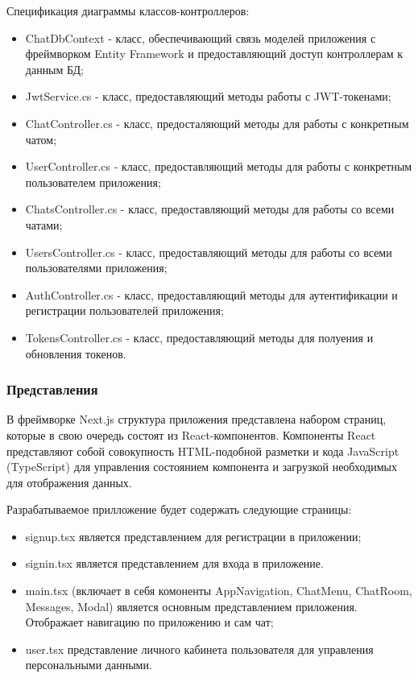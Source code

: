 Спецификация диаграммы классов-контроллеров:
\begin{itemize}
	\item ChatDbContext - класс, обеспечивающий связь моделей приложения с фреймворком Entity Framework и предоставляющий доступ контроллерам к данным БД\cite{ef};
	\item JwtService.cs - класс, предоставляющий методы работы с JWT-токенами;
	\item ChatController.cs - класс, предосталяющий методы для работы с конкретным чатом;
	\item UserController.cs - класс, предоставляющий методы для работы с конкретным пользователем приложения;
	\item ChatsController.cs - класс, предоставляющий методы для работы со всеми чатами;
	\item UsersController.cs - класс, предоставляющий методы для работы со всеми пользователями приложения;
	\item AuthController.cs - класс, предоставляющий методы для аутентификации и регистрации пользователей приложения;
	\item TokensController.cs - класс, предоставляющий методы для полуения и обновления токенов.
\end{itemize}

\subsubsection{Представления}

В фреймворке Next.js структура приложения представлена набором страниц, которые в свою очередь состоят из React-компонентов. Компоненты React представляют собой совокупность HTML-подобной разметки и кода JavaScript (TypeScript) для управления состоянием компонента и загрузкой необходимых для отображения данных\cite{nextjs}.

Разрабатываемое прилложение будет содержать следующие страницы:
\begin{itemize}
	\item signup.tsx является представлением для регистрации в приложении;
	\item signin.tsx является представлением для входа в приложение.
	\item main.tsx (включает в себя комоненты AppNavigation, ChatMenu, ChatRoom, Messages, Modal) является основным представлением приложения. Отображает навигацию по приложению и сам чат;
	\item user.tsx представление личного кабинета пользователя для управления персональными данными.
\end{itemize}

